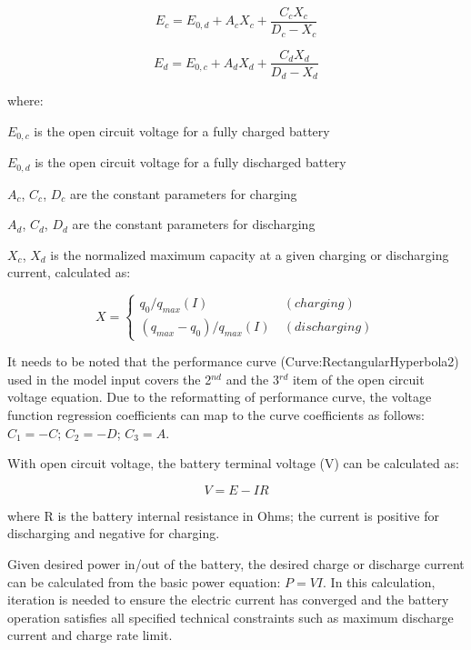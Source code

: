 \begin{equation}
{E_c} = {E_{0,d}} + {A_c}{X_c} + \frac{{{C_c}{X_c}}}{{{D_c} - {X_c}}}
\end{equation}

\begin{equation}
{E_d} = {E_{0,c}} + {A_d}{X_d} + \frac{{{C_d}{X_d}}}{{{D_d} - {X_d}}}
\end{equation}

where:

\({E_{0,c}}\) is the open circuit voltage for a fully charged battery

\({E_{0,d}}\) is the open circuit voltage for a fully discharged battery

\({A_c}\), \({C_c}\), \({D_c}\) are the constant parameters for charging

\({A_d}\), \({C_d}\), \({D_d}\) are the constant parameters for discharging

\({X_c}\), \({X_d}\) is the normalized maximum capacity at a given charging or discharging current, calculated as:

\begin{equation}
X = \left\{
    \begin{array}{cl}
      q_0 / q_{max}(I) & ~ (charging) \\
      (q_{max}-q_0)/q_{max}(I) & ~ (discharging)
    \end{array}
  \right.
\end{equation}

It needs to be noted that the performance curve (Curve:RectangularHyperbola2) used in the model input covers the 2\(^{nd}\) and the 3\(^{rd}\) item of the open circuit voltage equation. Due to the reformatting of performance curve, the voltage function regression coefficients can map to the curve coefficients as follows: \({C_1} = - C\); \({C_2} = - D\); \({C_3} = A\).

With open circuit voltage, the battery terminal voltage (V) can be calculated as:

\begin{equation}
V = E - IR
\end{equation}

where R is the battery internal resistance in Ohms; the current is positive for discharging and negative for charging.

Given desired power in/out of the battery, the desired charge or discharge current can be calculated from the basic power equation: \(P = VI\). In this calculation, iteration is needed to ensure the electric current has converged and the battery operation satisfies all specified technical constraints such as maximum discharge current and charge rate limit.

